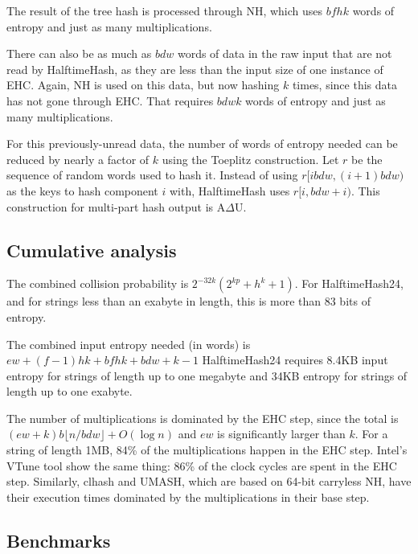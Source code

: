\documentclass{llncs}
\newcommand{\ints}{\mathbb{Z}}
\begin{document}
The result of the tree hash is processed through NH, which uses $b f h k$ words of entropy and just as many multiplications.

There can also be as much as $b d w$ words of data in the raw input that are not read by HalftimeHash, as they are less than the input size of one instance of EHC.
Again, NH is used on this data, but now hashing $k$ times, since this data has not gone through EHC.
That requires $b d w k$ words of entropy and just as many multiplications.

For this previously-unread data, the number of words of entropy needed can be reduced by nearly a factor of $k$ using the Toeplitz construction.
Let $r$ be the sequence of random words used to hash it.
Instead of using $r[i b d w, (i+1)b d w)$ as the keys to hash component $i$ with, HalftimeHash uses $r[i, b d w + i)$.
This construction for multi-part hash output is A$\Delta$U. \cite{ehc-nandi,woelfel-toeplitz}

\subsection{Cumulative analysis}

The combined collision probability is
$2^{-32k}\left(2^{kp} + h^k + 1\right)$.
For HalftimeHash24, and for strings less than an exabyte in length, this is more than 83 bits of entropy.

The combined input entropy needed (in words) is
$
e w
+ (f-1) h k
+ b f h k
+ b d w + k - 1
$
HalftimeHash24 requires 8.4KB input entropy for strings of length up to one megabyte and 34KB entropy for strings of length up to one exabyte.

The number of multiplications is dominated by the EHC step, since the total is $(e w + k) b \lfloor n / b d w \rfloor + O(\log n)$ and $e w$ is significantly larger than $k$.
For a string of length 1MB, 84\% of the multiplications happen in the EHC step. %
Intel's VTune tool show the same thing: 86\% of the clock cycles are spent in the EHC step.
Similarly, clhash and UMASH, which are based on 64-bit carryless NH, have their execution times dominated by the multiplications in their base step.~\cite{clhash,umash}

\subsection{Benchmarks}
\label{benchmarks}
\end{document}

